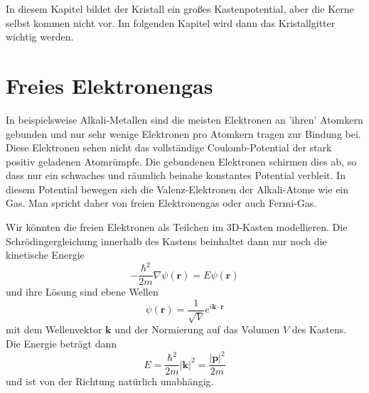 In diesem Kapitel bildet der Kristall ein großes Kastenpotential, aber die Kerne selbst kommen nicht vor. Im folgenden Kapitel wird dann das Kristallgitter wichtig werden.




 


\section{Freies Elektronengas}

In beispielsweise Alkali-Metallen sind die meisten Elektronen an 'ihren' Atomkern gebunden und nur sehr wenige Elektronen pro Atomkern tragen zur Bindung bei. Diese Elektronen sehen nicht das vollständige Coulomb-Potential der stark positiv geladenen Atomrümpfe. Die gebundenen Elektronen schirmen dies ab, so dass nur ein schwaches und räumlich beinahe konstantes Potential verbleit. In diesem Potential bewegen sich die Valenz-Elektronen der Alkali-Atome wie ein Gas. Man spricht daher von freien Elektronengas oder auch Fermi-Gas.

Wir könnten die freien Elektronen als Teilchen im 3D-Kasten modellieren. Die Schrödingergleichung innerhalb des Kastens beinhaltet dann nur noch die kinetische Energie
\begin{equation}
    - \frac{\hbar^2}{2m} \nabla  \psi(\mathbf{r}) = E  \psi(\mathbf{r})
\end{equation}
und ihre Lösung sind ebene Wellen 
\begin{equation}
    \psi(\mathbf{r}) = \frac{1}{\sqrt{V}} e^{i \mathbf{k} \cdot \mathbf{r}}
\end{equation}
mit dem Wellenvektor $\mathbf{k}$ und der Normierung auf das Volumen $V$ des Kastens. Die Energie beträgt dann
\begin{equation}
    E = \frac{\hbar^2 }{2m} |\mathbf{k}|^2 = \frac{|\mathbf{p}|^2 }{2m} 
\end{equation}
und ist von der Richtung natürlich unabhängig.

